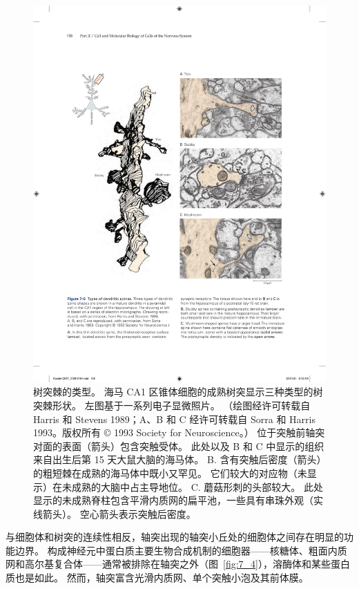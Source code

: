\begin{figure}[htbp]
	\centering
	\includegraphics[width=1.0\linewidth]{chap07/fig_7_5}
	\caption{树突棘的类型。 海马 CA1 区锥体细胞的成熟树突显示三种类型的树突棘形状。 左图基于一系列电子显微照片。 （绘图经许可转载自 Harris 和 Stevens 1989；A、B 和 C 经许可转载自 Sorra 和 Harris 1993。版权所有 © 1993 Society for Neuroscience。） 位于突触前轴突对面的表面（箭头）包含突触受体。 此处以及 B 和 C 中显示的组织来自出生后第 15 天大鼠大脑的海马体。 B. 含有突触后密度（箭头）的粗短棘在成熟的海马体中既小又罕见。 它们较大的对应物（未显示）在未成熟的大脑中占主导地位。 C. 蘑菇形刺的头部较大。 此处显示的未成熟脊柱包含平滑内质网的扁平池，一些具有串珠外观（实线箭头）。 空心箭头表示突触后密度。}
	\label{fig:7_5}
\end{figure}


与细胞体和树突的连续性相反，轴突出现的轴突小丘处的细胞体之间存在明显的功能边界。
构成神经元中蛋白质主要生物合成机制的细胞器——核糖体、粗面内质网和高尔基复合体——通常被排除在轴突之外（图~\ref{fig:7_4}），溶酶体和某些蛋白质也是如此。
然而，轴突富含光滑内质网、单个突触小泡及其前体膜。



